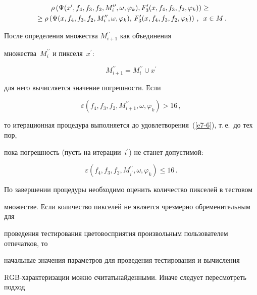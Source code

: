 \noindent


\begin{multline*}


\rho\left(\Psi(x^\prime,f_4,f_3,f_2,M^{\prime\prime}_i,\omega,\varphi_k),


F_3^\prime(x,f_4,f_3,f_2,\varphi_k)\right)\geq{}\\


{}\geq


\rho\left(\Psi(x,f_4,f_3,f_2,M^{\prime\prime}_i,\omega,\varphi_k),\,


F^\prime_3(x,f_4,f_3,f_2,\varphi_k)\right)\,,\enskip x\in M\,.


\end{multline*}





После определения множества $M^{\prime\prime}_{i+1}$ как объединения


множества~$M^{\prime\prime}_i$ и пикселя~$x^\prime$:


$$


M^{\prime\prime}_{i+1}=M^{\prime\prime}_i\cup x^\prime


$$


для него вычисляется значение погрешности. Если


$$


\varepsilon (f_4,f_3,f_2,M^{\prime\prime}_{i+1},\omega,\varphi_k)>16\,,


$$


то итерационная процедура выполняется до удовлетворения~(\ref{e7-6}), т.\,е.\ до тех пор,


пока погрешность (пусть на итерации~$i^\prime$) не станет допустимой:


$$


\varepsilon (f_4,f_3,f_2,M^{\prime\prime}_{i^\prime},\omega,\varphi_k)\leq16\,.


$$





По завершении процедуры необходимо оценить количество пикселей в тестовом


множестве. Если количество пикселей не является чрезмерно обременительным для


проведения тестирования цветовосприятия произвольным пользователем отпечатков, то


начальные значения параметров для проведения тестирования и вычисления


RGB-характеризации можно считать\linebreak найден\-ны\-ми. Иначе следует пересмотреть подход



